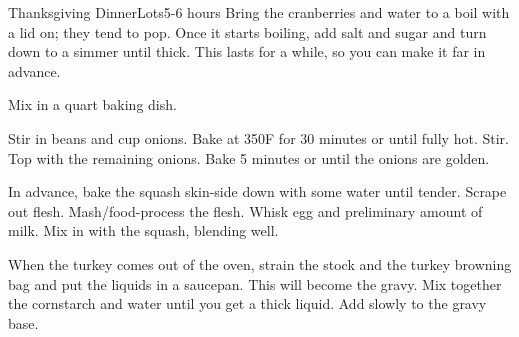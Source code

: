 \documentclass[../Cookbook.tex]{subfiles}
\begin{document}
\begin{recipe}{Thanksgiving Dinner}{Lots}{5-6 hours}
Bring the cranberries and water to a boil with a lid on; they tend to pop. Once it starts boiling, add salt and sugar and turn down to a simmer until thick. This lasts for a while, so you can make it far in advance.

Mix in a  quart baking dish.

Stir in beans and  cup onions. Bake at 350\0F for 30 minutes or until fully hot. Stir.\\
Top with the remaining onions. Bake 5 minutes or until the onions are golden.


In advance, bake the squash skin-side down with some water until tender.
Scrape out flesh. Mash/food-process the flesh. Whisk egg and preliminary amount of milk. Mix in with the squash, blending well.

When the turkey comes out of the oven, strain the stock and the turkey browning bag and put the liquids in a saucepan. This will become the gravy. Mix together the cornstarch and water until you get a thick liquid. Add slowly to the gravy base.

\end{recipe}
\end{document}
